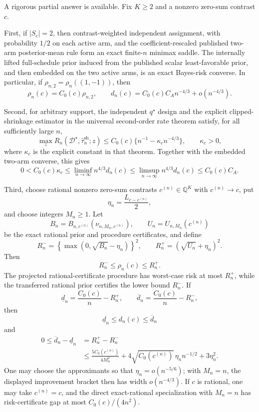 A rigorous partial answer is available.  Fix \(K\geq2\) and a nonzero zero-sum contrast \(c\).

First, if \(|S_c|=2\), then contrast-weighted independent assignment, with probability \(1/2\) on each active arm, and the coefficient-rescaled published two-arm posterior-mean rule form an exact finite-\(n\) minimax saddle.  The internally lifted full-schedule prior induced from the published scalar least-favorable prior, and then embedded on the two active arms, is an exact Bayes-risk converse.  In particular, if \(\rho_{n,2}=\rho_n((1,-1))\), then
\[
 \rho_n(c)=C_0(c)\rho_{n,2},
 \qquad
 d_n(c)=C_0(c)C_A n^{-4/3}+o(n^{-4/3}).
\]

Second, for arbitrary support, the independent \(q^\star\) design and the explicit clipped-shrinkage estimator in the universal second-order rate theorem satisfy, for all sufficiently large \(n\),
\[
 \max_z R_n(\mathcal D^\star,\widehat\tau_n^{\mathrm{sh}};z)
 \leq C_0(c)\{n^{-1}-\kappa_c n^{-4/3}\},
 \qquad \kappa_c>0,
\]
where \(\kappa_c\) is the explicit constant in that theorem.  Together with the embedded two-arm converse, this gives
\[
 0<C_0(c)\kappa_c
 \leq\liminf_{n\to\infty}n^{4/3}d_n(c)
 \leq\limsup_{n\to\infty}n^{4/3}d_n(c)
 \leq C_0(c)C_A.
\]

Third, choose rational nonzero zero-sum contrasts \(c^{(n)}\in\mathbb Q^K\) with \(c^{(n)}\to c\), put
\[
 \eta_n=\frac{L_{c-c^{(n)}}}{2},
\]
and choose integers \(M_n\geq1\).  Let
\[
 B_n=B_{n,c^{(n)}}(\nu_{n,M_n,c^{(n)}}),
 \qquad
 U_n=U_{n,M_n}(c^{(n)})
\]
be the exact rational prior and procedure certificates, and define
\[
 R_n^-=\left\{\max(0,\sqrt{B_n}-\eta_n)\right\}^2,
 \qquad
 R_n^+=(\sqrt{U_n}+\eta_n)^2.
\]
Then
\[
 R_n^-\leq\rho_n(c)\leq R_n^+.
\]
The projected rational-certificate procedure has worst-case risk at most \(R_n^+\), while the transferred rational prior certifies the lower bound \(R_n^-\).  If
\[
 \underline d_n=\frac{C_0(c)}n-R_n^+,
 \qquad
 \overline d_n=\frac{C_0(c)}n-R_n^-,
\]
then
\[
 \underline d_n\leq d_n(c)\leq\overline d_n
\]
and
\[
 \begin{aligned}
 0\leq\overline d_n-\underline d_n
 &=R_n^+-R_n^-\\
 &\leq\frac{5C_0(c^{(n)})}{4M_n^2}
 +4\sqrt{C_0(c^{(n)})}\,\eta_n n^{-1/2}
 +3\eta_n^2.
 \end{aligned}
\]
One may choose the approximants so that \(\eta_n=o(n^{-5/6})\); with \(M_n=n\), the displayed improvement bracket then has width \(o(n^{-4/3})\).  If \(c\) is rational, one may take \(c^{(n)}=c\), and the direct exact-rational specialization with \(M_n=n\) has risk-certificate gap at most \(C_0(c)/(4n^2)\).

